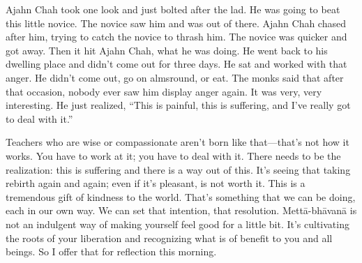 Ajahn Chah took one look and just bolted after the lad. He was going to
beat this little novice. The novice saw him and was out of there. Ajahn
Chah chased after him, trying to catch the novice to thrash him. The
novice was quicker and got away. Then it hit Ajahn Chah, what he was
doing. He went back to his dwelling place and didn’t come out for three
days. He sat and worked with that anger. He didn’t come out, go on
almsround, or eat. The monks said that after that occasion, nobody ever
saw him display anger again. It was very, very interesting. He just
realized, “This is painful, this is suffering, and I’ve really got to
deal with it.”

Teachers who are wise or compassionate aren’t born like that—that’s not
how it works. You have to work at it; you have to deal with it. There
needs to be the realization: this is suffering and there is a way out of
this. It’s seeing that taking rebirth again and again; even if it’s
pleasant, is not worth it. This is a tremendous gift of kindness to the
world. That’s something that we can be doing, each in our own way. We
can set that intention, that resolution. Mettā-bhāvanā is not an
indulgent way of making yourself feel good for a little bit. It’s
cultivating the roots of your liberation and recognizing what is of
benefit to you and all beings. So I offer that for reflection this
morning.
